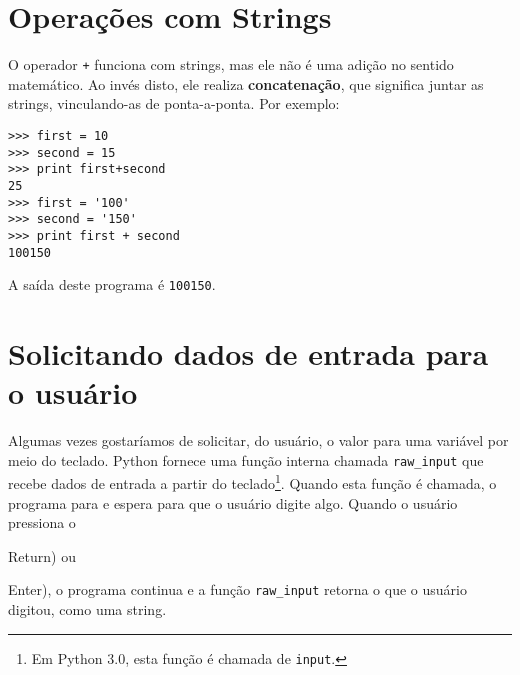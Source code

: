 {{{{{{{{{{{{{{%
\section{Operações com Strings}


O operador {\tt +} funciona com strings, mas ele 
não é uma adição no sentido matemático. Ao invés disto, ele realiza 
{\bf concatenação}, que significa juntar as strings,
vinculando-as de ponta-a-ponta. Por exemplo:


\beforeverb
\begin{verbatim}
>>> first = 10
>>> second = 15
>>> print first+second
25
>>> first = '100'
>>> second = '150'
>>> print first + second
100150
\end{verbatim}
\afterverb
%

A saída deste programa é {\tt 100150}.

\section{Solicitando dados de entrada para o usuário}


Algumas vezes gostaríamos de solicitar, do usuário, o valor para uma variável
por meio do teclado.
Python fornece uma função interna chamada \verb"raw_input" que recebe
dados de entrada a partir do teclado\footnote{Em Python 3.0, esta função é chamada de 
{\tt input}.}. Quando esta função é chamada, o programa para e 
espera para que o usuário digite algo. Quando o usuário pressiona o 
{\sf Return) ou {\sf Enter), o programa continua e a função \verb"raw_input"
retorna o que o usuário digitou, como uma string.

}}}}}}}}}}}}}}}}
